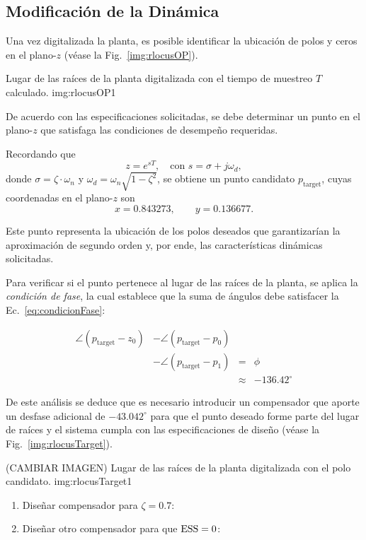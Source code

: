 \subsection{Modificaci\'on de la Din\'amica}

Una vez digitalizada la planta, es posible identificar la ubicaci\'on de polos y ceros en el plano-$z$ (v\'ease la Fig.~\ref{img:rlocusOP}).  

{Lugar de las ra\'ices de la planta digitalizada con el tiempo de muestreo $T$ calculado.}
{img:rlocusOP}{1}

De acuerdo con las especificaciones solicitadas, se debe determinar un punto en el plano-$z$ que satisfaga las condiciones de desempe\~no requeridas.  

Recordando que 
\[
z = e^{sT}, \quad \text{con } s = \sigma + j\omega_d,
\]
donde $\sigma = \zeta \cdot \omega_n$ y $\omega_d = \omega_n \sqrt{1-\zeta^2}$,
se obtiene un punto candidato $p_{\text{target}}$, cuyas coordenadas en el plano-$z$ son
\[
x = 0.843273, \qquad y = 0.136677.
\]

Este punto representa la ubicaci\'on de los polos deseados que garantizar\'ian la aproximaci\'on de segundo orden y, por ende, las caracter\'isticas din\'amicas solicitadas.  

Para verificar si el punto pertenece al lugar de las ra\'ices de la planta, se aplica la \emph{condici\'on de fase}, la cual establece que la suma de \'angulos debe satisfacer la Ec.~\eqref{eq:condicionFase}:

\begin{equation}
	\begin{aligned}
		\angle (p_{\text{target}}-z_0) 
		&- \angle (p_{\text{target}}-p_0) \\
		&- \angle (p_{\text{target}}-p_1) 
		&=& \phi \\&&\approx& -136.42^\circ
	\end{aligned}
	\label{eq:condicionFase}
\end{equation}

De este an\'alisis se deduce que es necesario introducir un compensador que aporte un desfase adicional de $-43.042^\circ$ para que el punto deseado forme parte del lugar de ra\'ices y el sistema cumpla con las especificaciones de dise\~no (v\'ease la Fig.~\ref{img:rlocusTarget}).  

(CAMBIAR IMAGEN)
{Lugar de las ra\'ices de la planta digitalizada con el polo candidato.}
{img:rlocusTarget}{1}

\begin{enumerate}[label=3.\arabic*.]
	\item Diseñar compensador para $\zeta = 0.7$: 
	\item Diseñar otro compensador para que $\mathrm{ESS} = 0$: 
\end{enumerate}